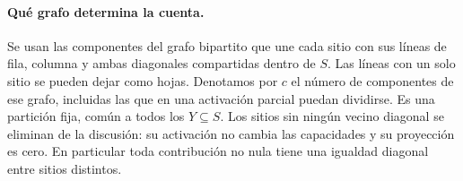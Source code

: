 \paragraph{Qué grafo determina la cuenta.}
Se usan las componentes del grafo bipartito que une cada sitio con sus líneas
de fila, columna y ambas diagonales compartidas dentro de $S$. Las líneas con un
solo sitio se pueden dejar como hojas. Denotamos por $c$ el número de componentes
de ese grafo, incluidas las que en una activación parcial puedan dividirse.
Es una partición fija, común a todos los $Y\subseteq S$. Los sitios sin ningún
vecino diagonal se eliminan de la discusión: su activación no cambia las capacidades
y su proyección es cero. En particular toda contribución no nula tiene una igualdad
diagonal entre sitios distintos.
